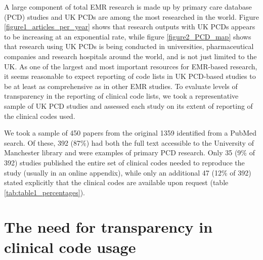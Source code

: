 \documentclass[10pt]{article}
\begin{document}
A large component of total EMR research is made up by primary care database (PCD) studies and UK PCDs are among the most researched in the world.  Figure \ref{figure1_articles_per_year} shows that research outputs with UK PCDs appears to be increasing at an exponential rate, while figure \ref{figure2_PCD_map} shows that research using UK PCDs is being conducted in universities, pharmaceutical companies and research hospitals around the world, and is not just limited to the UK.  As one of the largest and most important resources for EMR-based research, it seems reasonable to expect reporting of code lists in UK PCD-based studies to be at least as comprehensive as in other EMR studies.  To evaluate levels of transparency in the reporting of clinical code lists, we took a representative sample of UK PCD studies and assessed each study on its extent of reporting of the clinical codes used.

We took a sample of 450 papers from the original 1359 identified from a PubMed search.  Of these, 392 (87\%) had both  the full text accessible to the University of Manchester library and were examples of primary PCD research.  Only 35 (9\% of 392) studies published the entire set of clinical codes needed to reproduce the study (usually in an online appendix), while only an additional 47 (12\% of 392) stated explicitly that the clinical codes are available upon request (table \ref{tab:table1_percentages}).


\section*{The need for transparency in clinical code usage}
\end{document}
